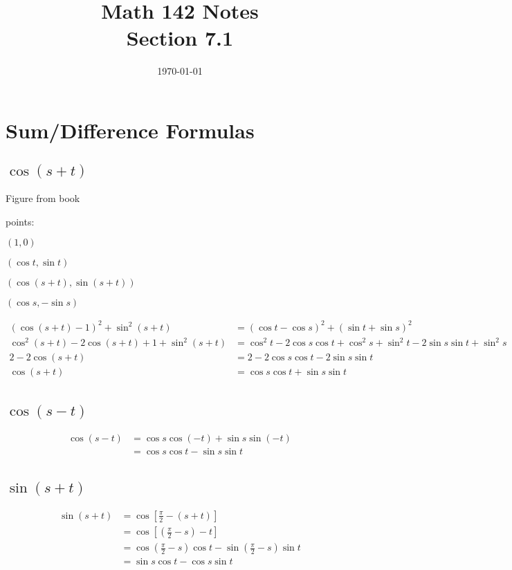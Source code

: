 \documentclass{exam}
\title{Math 142 Notes \\ Section 7.1}
\date{\today}
\begin{document}
  \maketitle
  \tableofcontents

  \section{Sum/Difference Formulas}

  \subsection{$\cos(s + t)$}
  Figure from book

  points:
  \begin{itemize*}
    \item $(1, 0)$
    \item $(\cos t, \sin t)$
    \item $(\cos (s + t), \sin (s + t))$
    \item $(\cos s, - \sin s)$
  \end{itemize*}

  \begin{align*}
    (\cos(s + t) - 1)^2 + \sin^2(s + t)               & = (\cos t - \cos s)^2 + (\sin t + \sin s)^2 \\
    \cos^2(s + t) - 2 \cos(s + t) + 1 + \sin^2(s + t) & = \cos^2 t - 2 \cos s \cos t + \cos^2 s + \sin^2 t - 2 \sin s \sin t + \sin^2 s \\
    2 - 2 \cos(s + t)                                 & = 2 - 2 \cos s \cos t - 2 \sin s \sin t \\
    \cos(s + t)                                       & = \cos s \cos t + \sin s \sin t \\
  \end{align*}

  \subsection{$\cos(s - t)$}
  \begin{align*}
    \cos(s - t) & = \cos s \cos (-t) + \sin s \sin (-t) \\
                & = \cos s \cos t - \sin s \sin t \\
  \end{align*}

  \subsection{$\sin(s + t)$}
  \begin{align*}
    \sin(s + t) & = \cos \left[ \frac{\pi}{2} - (s + t) \right] \\
                & = \cos \left[ \left(\frac{\pi}{2} - s \right) - t \right] \\
                & = \cos \left( \frac{\pi}{2} - s \right) \cos t - \sin \left( \frac{\pi}{2} - s \right) \sin t \\
                & = \sin s \cos t - \cos s \sin t \\
  \end{align*}
\end{document}
